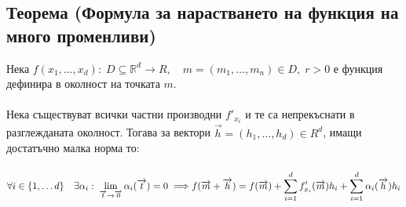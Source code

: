 \documentclass[14pt]{extarticle}
\newcommand{\R}{\mathbb{R}}
\newcommand{\Sum}{\displaystyle\sum}
\newcommand{\Lim}[2]{\displaystyle\lim_{#1 \to #2}}
\newcommand{\Vector}[1]{\overrightarrow{#1}}
\begin{document}
\subsection*{Теорема (Формула за нарастването на функция на много променливи)}
Нека \(f(x_1, \dots, x_d) : \; D \subseteq \R^d \to R, \quad m = (m_1, \dots, m_n) \in D, \; r > 0\) е функция дефинира в околност на точката \(m\). \\\\
Нека съществуват всички частни производни \(f'_{x_i}\) и те са непрекъснати в разглежданата околност. Тогава за вектори \(\Vector{h} = (h_1, \dots, h_d) \in R^d\), имащи достатъчно малка норма то: \\\\
\(\forall i \in \{1, \dots d\} \quad \exists \alpha_i : \; \Lim{\Vector{t}}{\Vector{0}} \alpha_i(\Vector{t}) = 0 \implies \\\\
f(\Vector{m} + \Vector{h}) = f(\Vector{m}) + \Sum_{i = 1}^d f'_{x_i}(\Vector{m})h_i + \Sum_{i = 1}^d \alpha_{i}(\Vector{h})h_i \)
\end{document}
